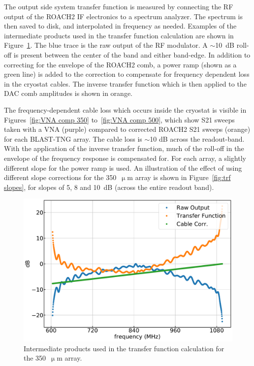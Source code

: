 The output side system transfer function is measured by connecting the RF output of the ROACH2 IF electronics to a spectrum analyzer. The spectrum is then saved to disk, and interpolated in frequency as needed. Examples of the intermediate products used in the transfer function calculation are shown in Figure~\ref{fig:350 TRF}. The blue trace is the raw output of the RF modulator. A $\sim$10~dB roll-off is present between the center of the band and either band-edge. In addition to correcting for the envelope of the ROACH2 comb, a power ramp (shown as a green line) is added to the correction to compensate for frequency dependent loss in the cryostat cables. The inverse transfer function which is then applied to the DAC comb amplitudes is shown in orange.

The frequency-dependent cable loss which occurs inside the cryostat is visible in Figures~\ref{fig:VNA comp 350} to~\ref{fig:VNA comp 500}, which show \gls{S21} sweeps taken with a VNA (purple) compared to corrected ROACH2 \gls{S21} sweeps (orange) for each BLAST-TNG array. The cable loss is $\sim$10 dB across the readout-band. With the application of the inverse transfer function, much of the roll-off in the envelope of the frequency response is compensated for. For each array, a slightly different slope for the power ramp is used. An illustration of the effect of using different slope corrections for the 350~$\upmu$m array is shown in Figure~\ref{fig:trf slopes}, for slopes of 5, 8 and 10~dB (across the entire readout band).

\begin{figure}[!htbp]
\centering
\includegraphics[width=\textwidth]{figures/blast_data/sweeps/r3_transfunc}
\caption[~Intermediate products used in the transfer function calculation for the  array.]{Intermediate products used in the transfer function calculation for the 350~$\upmu$m array.}
\label{fig:350 TRF}
\end{figure}

